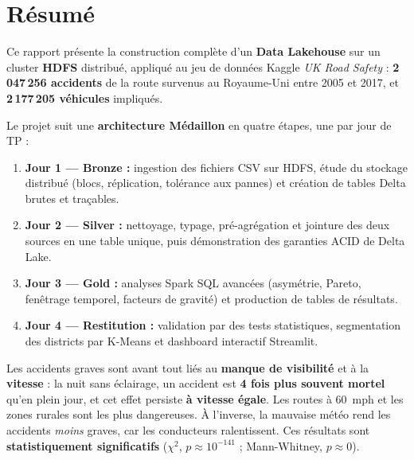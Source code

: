 \documentclass[11pt,a4paper]{report}
\begin{document}
\chapter*{Résumé}

Ce rapport présente la construction complète d'un \textbf{Data Lakehouse} sur un cluster \textbf{HDFS} distribué, appliqué au jeu de données Kaggle \emph{UK Road Safety} : \textbf{2\,047\,256 accidents} de la route survenus au Royaume-Uni entre 2005 et 2017, et \textbf{2\,177\,205 véhicules} impliqués.

Le projet suit une \textbf{architecture Médaillon} en quatre étapes, une par jour de TP :
\begin{enumerate}
  \item \textbf{Jour 1 — Bronze :} ingestion des fichiers CSV sur HDFS, étude du stockage distribué (blocs, réplication, tolérance aux pannes) et création de tables Delta brutes et traçables.
  \item \textbf{Jour 2 — Silver :} nettoyage, typage, pré-agrégation et jointure des deux sources en une table unique, puis démonstration des garanties ACID de Delta Lake.
  \item \textbf{Jour 3 — Gold :} analyses Spark SQL avancées (asymétrie, Pareto, fenêtrage temporel, facteurs de gravité) et production de tables de résultats.
  \item \textbf{Jour 4 — Restitution :} validation par des tests statistiques, segmentation des districts par K-Means et dashboard interactif Streamlit.
\end{enumerate}

\begin{keybox}
Les accidents graves sont avant tout liés au \textbf{manque de visibilité} et à la \textbf{vitesse} : la nuit sans éclairage, un accident est \textbf{4 fois plus souvent mortel} qu'en plein jour, et cet effet persiste \textbf{à vitesse égale}. Les routes à 60~mph et les zones rurales sont les plus dangereuses. À l'inverse, la mauvaise météo rend les accidents \emph{moins} graves, car les conducteurs ralentissent. Ces résultats sont \textbf{statistiquement significatifs} ($\chi^2$, $p \approx 10^{-141}$ ; Mann-Whitney, $p \approx 0$).
\end{keybox}
\end{document}
